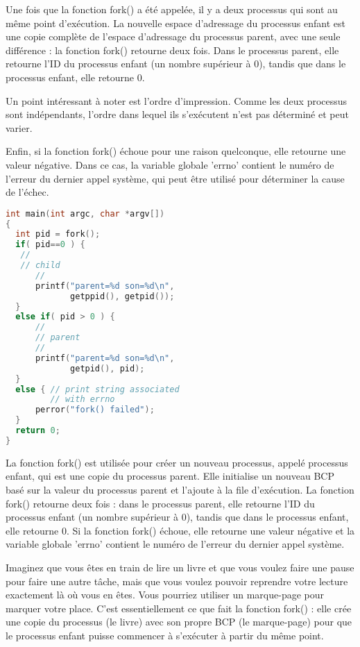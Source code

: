 \documentclass[12pt]{report}
\begin{document}
Une fois que la fonction fork() a été appelée, il y a deux processus qui sont au même point d'exécution. La nouvelle espace d'adressage du processus enfant est une copie complète de l'espace d'adressage du processus parent, avec une seule différence : la fonction fork() retourne deux fois. Dans le processus parent, elle retourne l'ID du processus enfant (un nombre supérieur à 0), tandis que dans le processus enfant, elle retourne 0. 

Un point intéressant à noter est l'ordre d'impression. Comme les deux processus sont indépendants, l'ordre dans lequel ils s'exécutent n'est pas déterminé et peut varier. 

Enfin, si la fonction fork() échoue pour une raison quelconque, elle retourne une valeur négative. Dans ce cas, la variable globale 'errno' contient le numéro de l'erreur du dernier appel système, qui peut être utilisé pour déterminer la cause de l'échec.
\begin{lstlisting}[language=C]
int main(int argc, char *argv[])
{
  int pid = fork();
  if( pid==0 ) { 
   //
   // child
      //
      printf("parent=%d son=%d\n",
             getppid(), getpid());
  }
  else if( pid > 0 ) {
      //
      // parent
      //
      printf("parent=%d son=%d\n",
             getpid(), pid);
  }
  else { // print string associated
         // with errno   
      perror("fork() failed"); 
  }
  return 0;
}
\end{lstlisting}
\begin{tcolorbox}[colback=yellow!5, colframe=yellow!80!black, title={\faBookmark À retenir}]
La fonction fork() est utilisée pour créer un nouveau processus, appelé processus enfant, qui est une copie du processus parent. Elle initialise un nouveau BCP basé sur la valeur du processus parent et l'ajoute à la file d'exécution. La fonction fork() retourne deux fois : dans le processus parent, elle retourne l'ID du processus enfant (un nombre supérieur à 0), tandis que dans le processus enfant, elle retourne 0. Si la fonction fork() échoue, elle retourne une valeur négative et la variable globale 'errno' contient le numéro de l'erreur du dernier appel système.
\end{tcolorbox}
\begin{tcolorbox}[colback=green!5, colframe=green!75!black, title={\faLightbulb Intuition}]
Imaginez que vous êtes en train de lire un livre et que vous voulez faire une pause pour faire une autre tâche, mais que vous voulez pouvoir reprendre votre lecture exactement là où vous en êtes. Vous pourriez utiliser un marque-page pour marquer votre place. C'est essentiellement ce que fait la fonction fork() : elle crée une copie du processus (le livre) avec son propre BCP (le marque-page) pour que le processus enfant puisse commencer à s'exécuter à partir du même point.
\end{tcolorbox}
\end{document}
